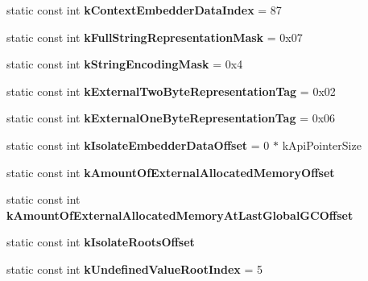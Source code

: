\begin{DoxyCompactItemize}
\item 
\hypertarget{classv8_1_1internal_1_1Internals_afb65846499ec5f68172e4b2e8301a493}{}static const int {\bfseries k\+Context\+Embedder\+Data\+Index} = 87\label{classv8_1_1internal_1_1Internals_afb65846499ec5f68172e4b2e8301a493}

\item 
\hypertarget{classv8_1_1internal_1_1Internals_a5c39a86b30463928ea719def66916507}{}static const int {\bfseries k\+Full\+String\+Representation\+Mask} = 0x07\label{classv8_1_1internal_1_1Internals_a5c39a86b30463928ea719def66916507}

\item 
\hypertarget{classv8_1_1internal_1_1Internals_a1927ac3def13a57e03025e62ca46d1c5}{}static const int {\bfseries k\+String\+Encoding\+Mask} = 0x4\label{classv8_1_1internal_1_1Internals_a1927ac3def13a57e03025e62ca46d1c5}

\item 
\hypertarget{classv8_1_1internal_1_1Internals_a73faf917416d2519b65c7255e77a74ce}{}static const int {\bfseries k\+External\+Two\+Byte\+Representation\+Tag} = 0x02\label{classv8_1_1internal_1_1Internals_a73faf917416d2519b65c7255e77a74ce}

\item 
\hypertarget{classv8_1_1internal_1_1Internals_ac789a0a139ccbacec0c5fb2d79427305}{}static const int {\bfseries k\+External\+One\+Byte\+Representation\+Tag} = 0x06\label{classv8_1_1internal_1_1Internals_ac789a0a139ccbacec0c5fb2d79427305}

\item 
\hypertarget{classv8_1_1internal_1_1Internals_ad722bf4760df09958cd1062db4a5524c}{}static const int {\bfseries k\+Isolate\+Embedder\+Data\+Offset} = 0 $\ast$ k\+Api\+Pointer\+Size\label{classv8_1_1internal_1_1Internals_ad722bf4760df09958cd1062db4a5524c}

\item 
static const int {\bfseries k\+Amount\+Of\+External\+Allocated\+Memory\+Offset}
\item 
static const int {\bfseries k\+Amount\+Of\+External\+Allocated\+Memory\+At\+Last\+Global\+G\+C\+Offset}
\item 
static const int {\bfseries k\+Isolate\+Roots\+Offset}
\item 
\hypertarget{classv8_1_1internal_1_1Internals_a7281ff0eafed559e64613465b1a03296}{}static const int {\bfseries k\+Undefined\+Value\+Root\+Index} = 5\label{classv8_1_1internal_1_1Internals_a7281ff0eafed559e64613465b1a03296}


\end{DoxyCompactItemize}
